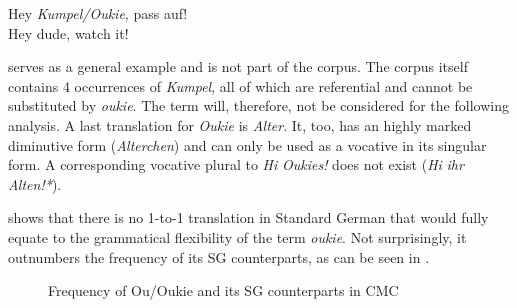 \documentclass[output=paper]{langsci/langscibook}
\begin{document}
\ea
\label{ex:radke:20}
	Hey \textit{Kumpel/Oukie}, pass auf!\\
 	Hey dude, watch it! \\
\z


 serves as a general example and is not part of the corpus. The corpus itself contains 4 occurrences of \textit{Kumpel}, all of which are  referential and cannot be substituted by \textit{oukie}. The term will, therefore,  not be considered for the following analysis. A last translation for \textit{Oukie} is \textit{Alter}. It, too, has an highly marked diminutive form (\textit{Alterchen}) and can only be used as a vocative in its singular form. A corresponding vocative plural to \textit{Hi} \textit{Oukies!} does not exist (\textit{Hi} \textit{ihr} \textit{Alten!*}).

 shows that there is no 1-to-1 translation in Standard German that would fully equate to the grammatical flexibility of the term \textit{oukie}. Not surprisingly, it outnumbers the frequency of its SG counterparts, as can be seen in .

  
 

  \begin{figure}
\caption{Frequency of {Ou/Oukie} and its SG counterparts in CMC}
\label{fig:radke:4}
\end{figure}  
\end{document}

